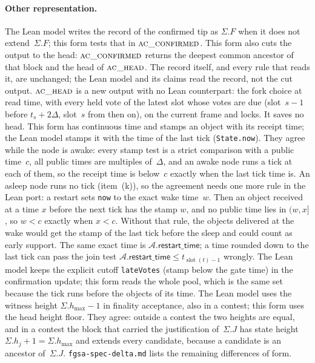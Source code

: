 \documentclass{article}
\newcommand{\slot}{\operatorname{slot}}
\newcommand{\hmax}{h_{\max}}
\newcommand{\AC}{\mathcal A}
\newcommand{\restartTime}{\mathsf{restart\_time}}
\begin{document}
\paragraph{Other representation.}
The Lean model writes the record of the confirmed tip as $\Sigma.F$ when
it does not extend~$\Sigma.F$; this form tests that in
$\Call{ac\_confirmed}{}$.  This form also cuts the output to the head:
$\Call{ac\_confirmed}{}$ returns the deepest common ancestor of that block
and the head of $\Call{ac\_head}{}$.  The record itself, and every rule that
reads it, are unchanged; the Lean model and its claims read the record,
not the cut output.  $\Call{ac\_head}{}$ is a new output with no Lean
counterpart: the fork choice at read time, with every held vote of the
latest slot whose votes are due (slot~$s-1$ before $t_s+2\Delta$, slot~$s$
from then on), on the current frame and locks.  It saves no head.
This form has continuous time and stamps an object with its receipt
time; the Lean model stamps it with the time of the last tick
(\texttt{State.now}).  They agree while the node is awake: every stamp
test is a strict comparison with a public time~$c$, all public times are
multiples of~$\Delta$, and an awake node runs a tick at each of them, so
the receipt time is below~$c$ exactly when the last tick time is.  An
asleep node runs no tick (item~(k)), so the agreement needs one more rule
in the Lean port: a restart sets \texttt{now} to the exact wake time~$w$.
Then an object received at a time $x$ before the next tick has the stamp
$w$, and no public time lies in $(w,x]$, so $w<c$ exactly when $x<c$.
Without that rule, the objects delivered at the wake would get the stamp
of the last tick before the sleep and could count as early support.  The
same exact time is $\AC.\restartTime$; a time rounded down to the last
tick can pass the join test $\AC.\restartTime\leq t_{\slot(t)-1}$ wrongly.
The Lean model keeps the explicit cutoff \texttt{lateVotes} (stamp below
the gate time) in the confirmation update; this form reads the whole
pool, which is the same set because the tick runs before the objects of
its time.  The Lean model uses the witness height
$\Sigma.\hmax-1$ in finality acceptance, also in a contest; this form uses
the head height floor.  They agree: outside a contest the two heights are equal,
and in a contest the block that carried the justification of~$\Sigma.J$
has state height $\Sigma.h_j+1=\Sigma.\hmax$ and extends every candidate,
because a candidate is an ancestor of~$\Sigma.J$.
\texttt{fgsa-spec-delta.md} lists the remaining differences of form.
\end{document}

